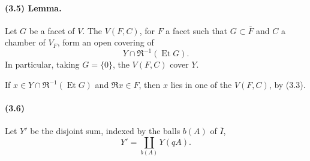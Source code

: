 \documentclass[10pt]{article}
\begin{document}
\paragraph{(3.5) Lemma.} Let \(G\) be a facet of \(V\). The \(V(F,C)\), for \(F\) a facet such that \(G\subset\overline F\) and \(C\) a chamber of \(V_F\), form an open covering of
\[
Y\cap \Re^{-1}(\operatorname{Et}G).
\]
In particular, taking \(G=\{0\}\), the \(V(F,C)\) cover \(Y\).

If \(x\in Y\cap\Re^{-1}(\operatorname{Et}G)\) and \(\Re x\in F\), then \(x\) lies in one of the \(V(F,C)\), by (3.3).

\paragraph{(3.6)} Let \(Y'\) be the disjoint sum, indexed by the balls \(b(A)\) of \(\overline I\),
\[
Y'=\coprod_{b(A)}Y(qA).
\]
\end{document}
